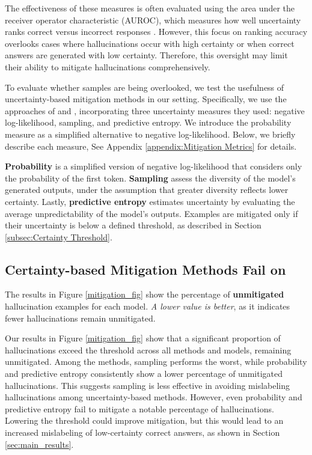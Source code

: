 The effectiveness of these measures is often evaluated using the area under the receiver operator characteristic (AUROC), which measures how well uncertainty ranks correct versus incorrect responses \cite{kuhn2023semantic}. However, this focus on ranking accuracy overlooks cases where hallucinations occur with high certainty or when correct answers are generated with low certainty. Therefore, this oversight may limit their ability to mitigate hallucinations comprehensively.




To evaluate whether \chk samples are being overlooked, we test the usefulness of uncertainty-based mitigation methods in our setting. Specifically, we use the approaches of \citet{tomani2024uncertainty} and \citet{cole-etal-2023-selectively}, incorporating three uncertainty measures they used: negative log-likelihood, sampling, and predictive entropy. 
We introduce the probability measure as a simplified alternative to negative log-likelihood. Below, we briefly describe each measure, See Appendix \ref{appendix:Mitigation Metrics} for details.

\textbf{Probability}  is a simplified version of negative log-likelihood that considers only the probability of the first token. \textbf{Sampling} assess the diversity of the model's generated outputs, under the assumption that greater diversity reflects lower certainty. Lastly, \textbf{predictive entropy} estimates uncertainty by evaluating the average unpredictability of the model’s outputs.
Examples are mitigated only if their uncertainty is below a defined threshold, as described in Section \ref{subsec:Certainty Threshold}.



\subsection{Certainty-based Mitigation Methods Fail on \chk}


The results in Figure \ref{mitigation_fig} show the percentage of \textbf{unmitigated} hallucination examples for each model. \emph{A lower value is better}, as it indicates fewer hallucinations remain unmitigated.


Our results in Figure \ref{mitigation_fig} show that a significant proportion of hallucinations exceed the threshold across all methods and models, remaining unmitigated. Among the methods, sampling performs the worst, while probability and predictive entropy consistently show a lower percentage of unmitigated hallucinations. This suggests sampling is less effective in avoiding mislabeling hallucinations among uncertainty-based methods.
However, even probability and predictive entropy fail to mitigate a notable percentage of hallucinations. Lowering the threshold could improve mitigation, but this would lead to an increased mislabeling of low-certainty correct answers, as shown in Section \ref{sec:main_results}.

